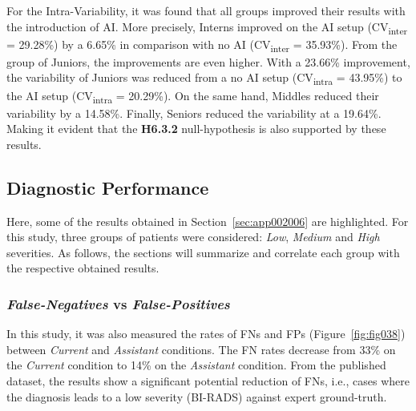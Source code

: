 For the Intra-Variability, it was found that all groups improved their results with the introduction of \ac{AI}.
More precisely, Interns improved on the \ac{AI} setup (CV\textsubscript{inter} = 29.28\%) by a 6.65\% in comparison with no \ac{AI} (CV\textsubscript{inter} = 35.93\%).
From the group of Juniors, the improvements are even higher.
With a 23.66\% improvement, the variability of Juniors was reduced from a no \ac{AI} setup (CV\textsubscript{intra} = 43.95\%) to the \ac{AI} setup (CV\textsubscript{intra} = 20.29\%).
On the same hand, Middles reduced their variability by a 14.58\%.
Finally, Seniors reduced the variability at a 19.64\%.
Making it evident that the {\bf H6.3.2} null-hypothesis is also supported by these results.

\subsection{Diagnostic Performance}
\label{sec:app002004004}

Here, some of the results obtained in Section~\ref{sec:app002006} are highlighted.
For this study, three groups of patients were considered: {\it Low}, {\it Medium} and {\it High} severities.
As follows, the sections will summarize and correlate each group with the respective obtained results.

\subsubsection{{\it False-Negatives} vs {\it False-Positives}}
\label{sec:chap005006001006}

In this study, it was also measured the rates of \acp{FN} and \acp{FP} (Figure~\ref{fig:fig038}) between {\it Current} and {\it Assistant} conditions.
The \ac{FN} rates decrease from 33\% on the {\it Current} condition to 14\% on the {\it Assistant} condition.
From the published dataset\footnotemark[29], the results show a significant potential reduction of \acp{FN}, i.e., cases where the diagnosis leads to a low severity (\ac{BI-RADS}) against expert ground-truth.


